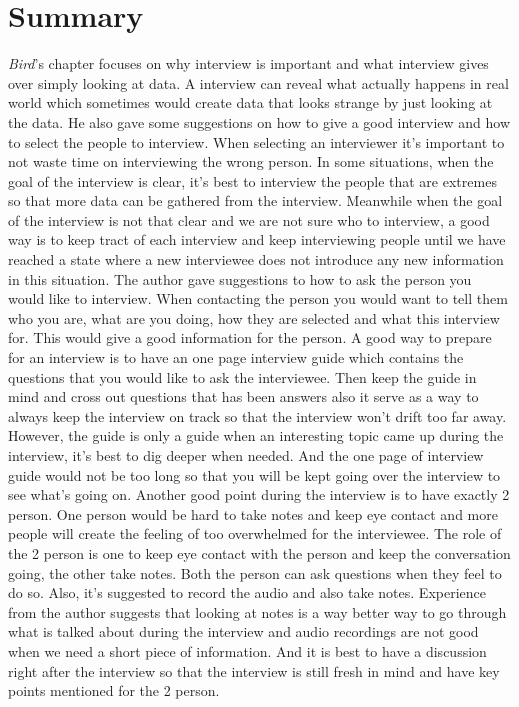 \documentclass[sigconf]{acmart}
\begin{document}
%
\maketitle

\section{Summary}

{\it Bird}'s chapter focuses on why interview is important and what interview gives over simply looking at data. A interview can reveal what actually happens in real world which sometimes would create data that looks strange by just looking at the data. He also gave some suggestions on how to give a good interview and how to select the people to interview. When selecting an interviewer it's important to not waste time on interviewing the wrong person. In some situations, when the goal of the interview is clear, it's best to interview the people that are extremes so that more data can be gathered from the interview. Meanwhile when the goal of the interview is not that clear and we are not sure who to interview, a good way is to keep tract of each interview and keep interviewing people until we have reached a state where a new interviewee does not introduce any new information in this situation. The author gave suggestions to how to ask the person you would like to interview. When contacting the person you would want to tell them who you are, what are you doing, how they are selected and what this interview for. This would give a good information for the person. A good way to prepare for an interview is to have an one page interview guide which contains the questions that you would like to ask the interviewee. Then keep the guide in mind and cross out questions that has been answers also it serve as a way to always keep the interview on track so that the interview won't drift too far away. However, the guide is only a guide when an interesting topic came up during the interview, it's best to dig deeper when needed. And the one page of interview guide would not be too long so that you will be kept going over the interview to see what's going on. Another good point during the interview is to have exactly 2 person. One person would be hard to take notes and keep eye contact and more people will create the feeling of too overwhelmed for the interviewee. The role of the 2 person is one to keep eye contact with the person and keep the conversation going, the other take notes. Both the person can ask questions when they feel to do so. Also, it's suggested to record the audio and also take notes. Experience from the author suggests that looking at notes is a way better way to go through what is talked about during the interview and audio recordings are not good when we need a short piece of information. And it is best to have a discussion right after the interview so that the interview is still fresh in mind and have key points mentioned for the 2 person. 
\end{document}
